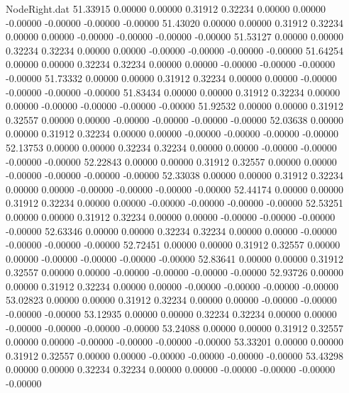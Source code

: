 \begin{filecontents}{NodeRight.dat}
  51.33915    0.00000    0.00000     0.31912    0.32234    0.00000    0.00000   -0.00000   -0.00000   -0.00000   -0.00000
  51.43020    0.00000    0.00000     0.31912    0.32234    0.00000    0.00000   -0.00000   -0.00000   -0.00000   -0.00000
  51.53127    0.00000    0.00000     0.32234    0.32234    0.00000    0.00000   -0.00000   -0.00000   -0.00000   -0.00000
  51.64254    0.00000    0.00000     0.32234    0.32234    0.00000    0.00000   -0.00000   -0.00000   -0.00000   -0.00000
  51.73332    0.00000    0.00000     0.31912    0.32234    0.00000    0.00000   -0.00000   -0.00000   -0.00000   -0.00000
  51.83434    0.00000    0.00000     0.31912    0.32234    0.00000    0.00000   -0.00000   -0.00000   -0.00000   -0.00000
  51.92532    0.00000    0.00000     0.31912    0.32557    0.00000    0.00000   -0.00000   -0.00000   -0.00000   -0.00000
  52.03638    0.00000    0.00000     0.31912    0.32234    0.00000    0.00000   -0.00000   -0.00000   -0.00000   -0.00000
  52.13753    0.00000    0.00000     0.32234    0.32234    0.00000    0.00000   -0.00000   -0.00000   -0.00000   -0.00000
  52.22843    0.00000    0.00000     0.31912    0.32557    0.00000    0.00000   -0.00000   -0.00000   -0.00000   -0.00000
  52.33038    0.00000    0.00000     0.31912    0.32234    0.00000    0.00000   -0.00000   -0.00000   -0.00000   -0.00000
  52.44174    0.00000    0.00000     0.31912    0.32234    0.00000    0.00000   -0.00000   -0.00000   -0.00000   -0.00000
  52.53251    0.00000    0.00000     0.31912    0.32234    0.00000    0.00000   -0.00000   -0.00000   -0.00000   -0.00000
  52.63346    0.00000    0.00000     0.32234    0.32234    0.00000    0.00000   -0.00000   -0.00000   -0.00000   -0.00000
  52.72451    0.00000    0.00000     0.31912    0.32557    0.00000    0.00000   -0.00000   -0.00000   -0.00000   -0.00000
  52.83641    0.00000    0.00000     0.31912    0.32557    0.00000    0.00000   -0.00000   -0.00000   -0.00000   -0.00000
  52.93726    0.00000    0.00000     0.31912    0.32234    0.00000    0.00000   -0.00000   -0.00000   -0.00000   -0.00000
  53.02823    0.00000    0.00000     0.31912    0.32234    0.00000    0.00000   -0.00000   -0.00000   -0.00000   -0.00000
  53.12935    0.00000    0.00000     0.32234    0.32234    0.00000    0.00000   -0.00000   -0.00000   -0.00000   -0.00000
  53.24088    0.00000    0.00000     0.31912    0.32557    0.00000    0.00000   -0.00000   -0.00000   -0.00000   -0.00000
  53.33201    0.00000    0.00000     0.31912    0.32557    0.00000    0.00000   -0.00000   -0.00000   -0.00000   -0.00000
  53.43298    0.00000    0.00000     0.32234    0.32234    0.00000    0.00000   -0.00000   -0.00000   -0.00000   -0.00000

\end{filecontents}
